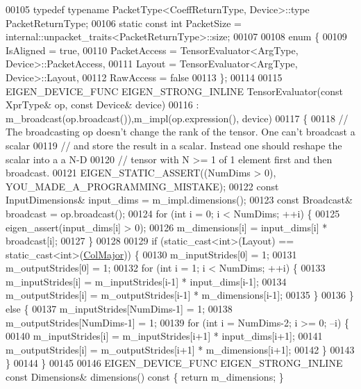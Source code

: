\begin{DoxyCode}
00105   \textcolor{keyword}{typedef} \textcolor{keyword}{typename} PacketType<CoeffReturnType, Device>::type PacketReturnType;
00106   \textcolor{keyword}{static} \textcolor{keyword}{const} \textcolor{keywordtype}{int} PacketSize = internal::unpacket\_traits<PacketReturnType>::size;
00107 
00108   \textcolor{keyword}{enum} \{
00109     IsAligned = \textcolor{keyword}{true},
00110     PacketAccess = TensorEvaluator<ArgType, Device>::PacketAccess,
00111     Layout = TensorEvaluator<ArgType, Device>::Layout,
00112     RawAccess = \textcolor{keyword}{false}
00113   \};
00114 
00115   EIGEN\_DEVICE\_FUNC EIGEN\_STRONG\_INLINE TensorEvaluator(\textcolor{keyword}{const} XprType& op, \textcolor{keyword}{const} Device& device)
00116     : m\_broadcast(op.broadcast()),m\_impl(op.expression(), device)
00117   \{
00118     \textcolor{comment}{// The broadcasting op doesn't change the rank of the tensor. One can't broadcast a scalar}
00119     \textcolor{comment}{// and store the result in a scalar. Instead one should reshape the scalar into a a N-D}
00120     \textcolor{comment}{// tensor with N >= 1 of 1 element first and then broadcast.}
00121     EIGEN\_STATIC\_ASSERT((NumDims > 0), YOU\_MADE\_A\_PROGRAMMING\_MISTAKE);
00122     \textcolor{keyword}{const} InputDimensions& input\_dims = m\_impl.dimensions();
00123     \textcolor{keyword}{const} Broadcast& broadcast = op.broadcast();
00124     \textcolor{keywordflow}{for} (\textcolor{keywordtype}{int} i = 0; i < NumDims; ++i) \{
00125       eigen\_assert(input\_dims[i] > 0);
00126       m\_dimensions[i] = input\_dims[i] * broadcast[i];
00127     \}
00128 
00129     \textcolor{keywordflow}{if} (static\_cast<int>(Layout) == static\_cast<int>(\hyperlink{group__enums_ggaacded1a18ae58b0f554751f6cdf9eb13a0cbd4bdd0abcfc0224c5fcb5e4f6669a}{ColMajor})) \{
00130       m\_inputStrides[0] = 1;
00131       m\_outputStrides[0] = 1;
00132       \textcolor{keywordflow}{for} (\textcolor{keywordtype}{int} i = 1; i < NumDims; ++i) \{
00133         m\_inputStrides[i] = m\_inputStrides[i-1] * input\_dims[i-1];
00134         m\_outputStrides[i] = m\_outputStrides[i-1] * m\_dimensions[i-1];
00135       \}
00136     \} \textcolor{keywordflow}{else} \{
00137       m\_inputStrides[NumDims-1] = 1;
00138       m\_outputStrides[NumDims-1] = 1;
00139       \textcolor{keywordflow}{for} (\textcolor{keywordtype}{int} i = NumDims-2; i >= 0; --i) \{
00140         m\_inputStrides[i] = m\_inputStrides[i+1] * input\_dims[i+1];
00141         m\_outputStrides[i] = m\_outputStrides[i+1] * m\_dimensions[i+1];
00142       \}
00143     \}
00144   \}
00145 
00146   EIGEN\_DEVICE\_FUNC EIGEN\_STRONG\_INLINE \textcolor{keyword}{const} Dimensions& dimensions()\textcolor{keyword}{ const }\{ \textcolor{keywordflow}{return} m\_dimensions; \}

\end{DoxyCode}
